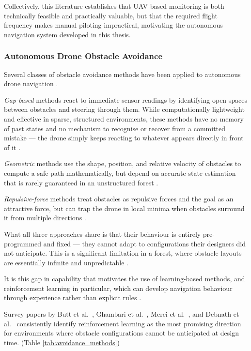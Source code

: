 \documentclass[../main.tex]{subfiles}
\begin{document}
Collectively, this literature establishes that UAV-based monitoring is both technically feasible and practically valuable, but that the required flight frequency makes manual piloting impractical, motivating the autonomous navigation system developed in this thesis.

\subsubsection{Autonomous Drone Obstacle Avoidance}

Several classes of obstacle avoidance methods have been applied to autonomous drone navigation \cite{Butt2024,Ghambari2024,Merei2025,Debnath2024}.

\textit{Gap-based} methods react to immediate sensor readings by identifying open spaces between obstacles and steering through them. While computationally lightweight and effective in sparse, structured environments, these methods have no memory of past states and no mechanism to recognise or recover from a committed mistake --- the drone simply keeps reacting to whatever appears directly in front of it \cite{Merei2025,Debnath2024}.

\textit{Geometric} methods use the shape, position, and relative velocity of obstacles to compute a safe path mathematically, but depend on accurate state estimation that is rarely guaranteed in an unstructured forest \cite{Ghambari2024,Debnath2024}.

\textit{Repulsive-force} methods treat obstacles as repulsive forces and the goal as an attractive force, but can trap the drone in local minima when obstacles surround it from multiple directions \cite{Merei2025}.

What all three approaches share is that their behaviour is entirely pre-programmed and fixed --- they cannot adapt to configurations their designers did not anticipate. This is a significant limitation in a forest, where obstacle layouts are essentially infinite and unpredictable \cite{Butt2024,Debnath2024}.

It is this gap in capability that motivates the use of learning-based methods, and reinforcement learning in particular, which can develop navigation behaviour through experience rather than explicit rules \cite{Fu2024,Schulman2017}.

Survey papers by Butt et al.\ \cite{Butt2024}, Ghambari et al.\ \cite{Ghambari2024}, Merei et al.\ \cite{Merei2025}, and Debnath et al.\ \cite{Debnath2024} consistently identify reinforcement learning as the most promising direction for environments where obstacle configurations cannot be anticipated at design time. (Table \ref{tab:avoidance_methods})
\end{document}
